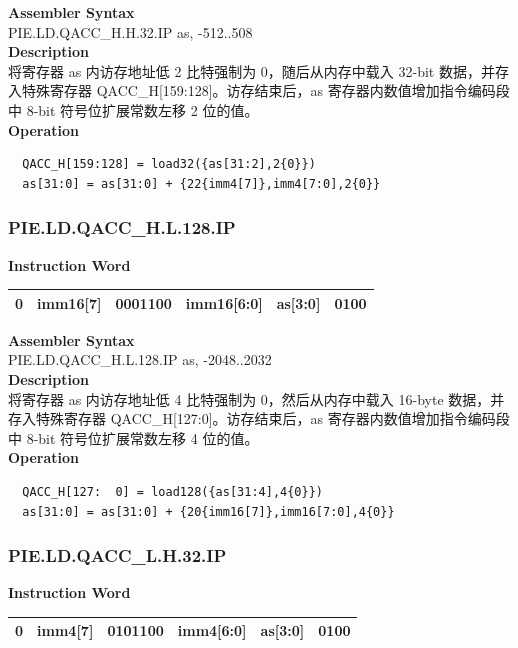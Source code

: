 \textbf{Assembler Syntax} \\
PIE.LD.QACC\_H.H.32.IP as, -512..508 \\
\textbf{Description} \\
将寄存器 as 内访存地址低 2 比特强制为 0，随后从内存中载入 32-bit 数据，并存入特殊寄存器 QACC\_H[159:128]。访存结束后，as 寄存器内数值增加指令编码段中 8-bit 符号位扩展常数左移 2 位的值。\\
\textbf{Operation}
\begin{lstlisting}
  QACC_H[159:128] = load32({as[31:2],2{0}})
  as[31:0] = as[31:0] + {22{imm4[7]},imm4[7:0],2{0}}
\end{lstlisting}

\newpage
\subsubsection{PIE.LD.QACC\_H.L.128.IP}\label{instruction:PIELDQACCHL128IP}
\setlength\tabcolsep{6pt}
\textbf{Instruction Word} \\
\begin{tabular}{|c|c|c|c|c|c|}
	\hline
	0 & imm16[7] & 0001100 & imm16[6:0] & as[3:0] & 0100 \\
	\hline
\end{tabular}

\textbf{Assembler Syntax} \\
PIE.LD.QACC\_H.L.128.IP as, -2048..2032 \\
\textbf{Description} \\
将寄存器 as 内访存地址低 4 比特强制为 0，然后从内存中载入 16-byte 数据，并存入特殊寄存器 QACC\_H[127:0]。访存结束后，as 寄存器内数值增加指令编码段中 8-bit 符号位扩展常数左移 4 位的值。\\
\textbf{Operation}
\begin{lstlisting}
  QACC_H[127:  0] = load128({as[31:4],4{0}})
  as[31:0] = as[31:0] + {20{imm16[7]},imm16[7:0],4{0}}
\end{lstlisting}

\newpage
\subsubsection{PIE.LD.QACC\_L.H.32.IP}\label{instruction:PIELDQACCLH32IP}
\setlength\tabcolsep{6pt}
\textbf{Instruction Word} \\
\begin{tabular}{|c|c|c|c|c|c|}
	\hline
	0 & imm4[7] & 0101100 & imm4[6:0] & as[3:0] & 0100 \\
	\hline
\end{tabular}

